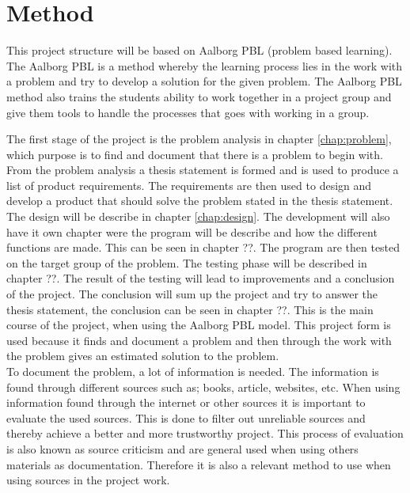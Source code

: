 \section{Method}
This project structure will be based on Aalborg PBL (problem based learning). The Aalborg PBL is a method whereby the learning process lies in the work with a problem and try to develop a solution for the given problem.
The Aalborg PBL method also trains the students ability to work together in a project group and give them tools to handle the processes that goes with working in a group.

The first stage of the project is the problem analysis in chapter \ref{chap:problem}, which purpose is to find and document that there is a problem to begin with. From the problem analysis a thesis statement is formed and is used to produce a list of product requirements.
The requirements are then used to design and develop a product that should solve the problem stated in the thesis statement. The design will be describe in chapter \ref{chap:design}.
The development will also have it own chapter were the program will be describe and how the different functions are made. This can be seen in chapter ??.
The program are then tested on the target group of the problem. The testing phase will be described in chapter ??. The result of the testing will lead to improvements and a conclusion of the project. The conclusion will sum up the project and try to answer the thesis statement, the conclusion can be seen in chapter ??. This is the main course of the project, when using the Aalborg PBL model.
This project form is used because it finds and document a problem and then through the work with the problem gives an estimated solution to the problem.\\

To document the problem, a lot of information is needed. The information is found through different sources such as; books, article, websites, etc. When using information found through the internet or other sources it is important to evaluate the used sources.
This is done to filter out unreliable sources and thereby achieve a better and more trustworthy project.
This process of evaluation is also known as source criticism and are general used when using others materials as documentation. Therefore it is also a relevant method to use when using sources in the project work.\\